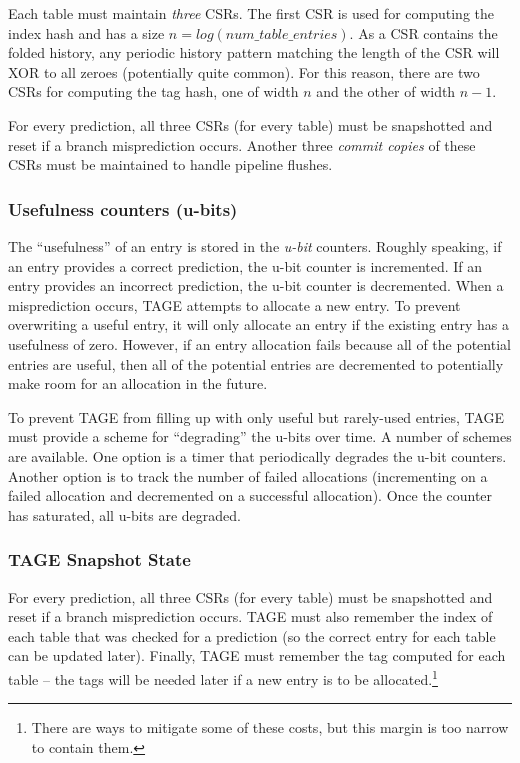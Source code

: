 Each table must maintain {\em three} CSRs.  The first CSR is used for computing the index hash and has a size $n=log(num\_table\_entries)$.  As a CSR contains the folded history, any periodic history pattern matching the length of the CSR will XOR to all zeroes (potentially quite common).  For this reason, there are two CSRs for computing the tag hash, one of width $n$ and the other of width $n-1$. 

For every prediction, all three CSRs (for every table) must be snapshotted and reset if a branch misprediction occurs. 
Another three {\em commit copies} of these CSRs must be maintained to handle pipeline flushes. 


\subsubsection{Usefulness counters (u-bits)}

The ``usefulness'' of an entry is stored in the {\em u-bit} counters.  Roughly speaking, if an entry provides a correct prediction, the u-bit counter is incremented. If an entry provides an incorrect prediction, the u-bit counter is decremented.  When a misprediction occurs, TAGE attempts to allocate a new entry.  To prevent overwriting a useful entry, it will only allocate an entry if the existing entry has a usefulness of zero.  However, if an entry allocation fails because all of the potential entries are useful, then all of the potential entries are decremented to potentially make room for an allocation in the future.

To prevent TAGE from filling up with only useful but rarely-used entries, TAGE must provide a scheme for ``degrading'' the u-bits over time.  A number of schemes are available.  One option is a timer that periodically degrades the u-bit counters.  Another option is to track the number of failed allocations (incrementing on a failed allocation and decremented on a successful allocation). Once the counter has saturated, all u-bits are degraded. 

\subsubsection{TAGE Snapshot State}

For every prediction, all three CSRs (for every table) must be snapshotted and reset if a branch misprediction occurs.  
TAGE must also remember the index of each table that was checked for a prediction (so the correct entry for each table can be updated later). 
Finally, TAGE must remember the tag computed for each table -- the tags will be needed later if a new entry is to be allocated.\footnote{There are ways to mitigate some of these costs, but this margin is too narrow to contain them.}

